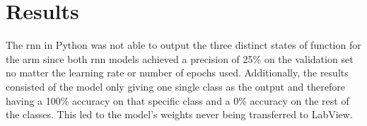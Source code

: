 \section{Results}
\label{section:results}

%
%
%
The \acrshort{rnn} in Python was not able to output the three distinct states of 
function for the arm since both \acrshort{rnn} models achieved a precision of 25\% on the validation set no matter the
learning rate or number of epochs used. Additionally, the results consisted of the model only giving one single class as the output
and therefore having a 100\% accuracy on that specific class and a 0\% accuracy on the rest of the classes. 
This led to the model's weights never being transferred to LabView.

